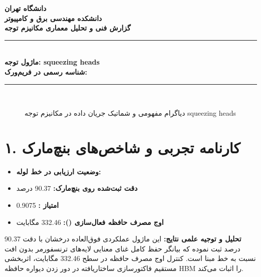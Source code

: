 \documentclass[12pt,a4paper]{article}
\begin{document}
\begin{center}
{\Large\bfseries دانشگاه تهران}\\[0.2cm]
{\large\bfseries دانشکده مهندسی برق و کامپیوتر}\\[0.2cm]
{\large\bfseries گزارش فنی و تحلیل معماری مکانیزم توجه}\\[0.5cm]
\rule{\linewidth}{1pt}\\[0.3cm]
{\LARGE\bfseries ماژول توجه: squeezing heads}\\[0.2cm]
{\large \textbf{شناسه رسمی در فریم‌ورک:} }\\[0.2cm]
\rule{\linewidth}{1pt}\\[0.5cm]
\end{center}

\begin{figure}[H]
\centering
{}
\caption{دیاگرام مفهومی و شماتیک جریان داده در مکانیزم توجه squeezing heads}
\end{figure}

\section*{۱. کارنامه تجربی و شاخص‌های بنچ‌مارک}
\begin{itemize}
\item \textbf{وضعیت ارزیابی در خط لوله:} 
\item \textbf{دقت ثبت‌شده روی بنچ‌مارک:} 90.37 درصد
\item \textbf{امتیاز :} 0.9075
\item \textbf{اوج مصرف حافظه فعال‌سازی ():} 332.46 مگابایت
\end{itemize}
\textbf{تحلیل و توجیه علمی نتایج:} این ماژول عملکردی فوق‌العاده درخشان با دقت 90.37 درصد ثبت نموده که بیانگر حفظ کامل غنای معنایی لایه‌های ترنسفورمر بدون افت نسبت به خط مبنا است. کنترل اوج مصرف حافظه در سطح 332.46 مگابایت، اثربخشی مستقیم فاکتورسازی ساختاریافته در دور زدن دیواره حافظه HBM را اثبات می‌کند.
\end{document}
